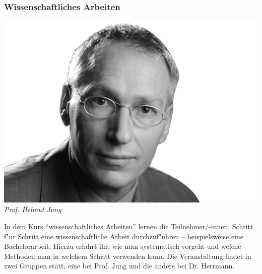\subsubsection{Wissenschaftliches Arbeiten}

\includegraphics[width=0.9\linewidth]{bilder/dozenten/jung_frei.png}\\
\textit{Prof. Helmut Jung}

In dem Kurs "`wissenschaftliches Arbeiten"' lernen die Teilnehmer/-innen, Schritt f"ur Schritt eine wissenschaftliche Arbeit durchzuf"uhren -- beispielsweise eine Bachelorarbeit.
Hierzu erfahrt ihr, wie man systematisch vorgeht und welche Methoden man in welchem Schritt verwenden kann.
Die Veranstaltung findet in zwei Gruppen statt, eine bei Prof. Jung und die andere bei Dr. Herrmann.

